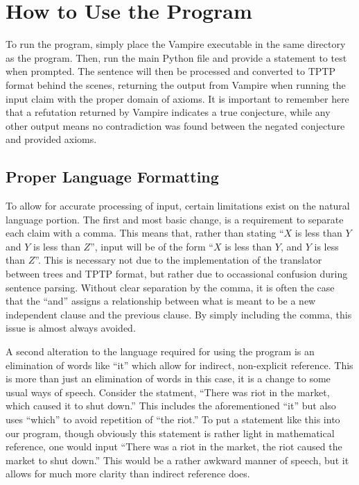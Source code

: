 \section{How to Use the Program}

To run the program, simply place the Vampire executable in the same directory as the program. Then, run the main Python file and provide a statement to test when prompted. The sentence will then be processed and converted to TPTP format behind the scenes, returning the output from Vampire when running the input claim with the proper domain of axioms. It is important to remember here that a refutation returned by Vampire indicates a true conjecture, while any other output means no contradiction was found between the negated conjecture and provided axioms.

\subsection{Proper Language Formatting}

To allow for accurate processing of input, certain limitations exist on the natural language portion. The first and most basic change, is a requirement to separate each claim with a comma. This means that, rather than stating ``$X$ is less than $Y$ and $Y$ is less than $Z$'', input will be of the form ``$X$ is less than $Y$, and $Y$ is less than $Z$''. This is necessary not due to the implementation of the translator between trees and TPTP format, but rather due to occassional confusion during sentence parsing. Without clear separation by the comma, it is often the case that the ``and'' assigns a relationship between what is meant to be a new independent clause and the previous clause. By simply including the comma, this issue is almost always avoided.

A second alteration to the language required for using the program is an elimination of words like ``it'' which allow for indirect, non-explicit reference. This is more than just an elimination of words in this case, it is a change to some usual ways of speech. Consider the statment, ``There was riot in the market, which caused it to shut down.'' This includes the aforementioned ``it'' but also uses ``which'' to avoid repetition of ``the riot.'' To put a statement like this into our program, though obviously this statement is rather light in mathematical reference, one would input ``There was a riot in the market, the riot caused the market to shut down.'' This would be a rather awkward manner of speech, but it allows for much more clarity than indirect reference does. 

